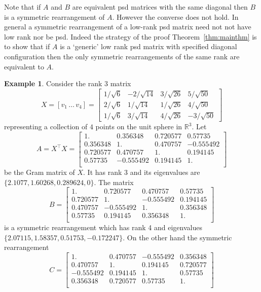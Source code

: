 \documentclass{article}
\theoremstyle{definition}
\newtheorem{Example}{Example}
\renewcommand{\r}{\mathbb{R}}
\renewcommand{\|}{|}
\begin{document}
Note that if $A$ and $B$ are equivalent psd matrices with the same diagonal then $B$ is a symmetric rearrangement of $A$. However the converse does not hold. In general a symmetric rearrangement of a low-rank psd matrix need not not have low rank nor be psd. Indeed the strategy of the proof Theorem~\ref{thm:mainthm} is to show that if $A$ is a `generic' low rank psd matrix with specified
diagonal configuration then the only symmetric rearrangements of the same rank are equivalent to $A$.
\begin{Example}
Consider the rank $3$ matrix 
$$X = [v_1\, \dots\, v_4] = \begin{bmatrix}
    1/\sqrt{6} & -2/\sqrt{14} & 3/\sqrt{26} & 5/\sqrt{50} \\
    2/\sqrt{6} & 1/\sqrt{14} & 1/\sqrt{26} & 4/\sqrt{50} \\
    1/\sqrt{6} & 3/\sqrt{14} & 4/\sqrt{26} & -3/\sqrt{50}
\end{bmatrix}$$representing a collection of $4$ points on the unit sphere in $\r^3$.
Let $$A = X^\top X = \begin{bmatrix}
 1. & 0.356348 & 0.720577 & 0.57735 \\
 0.356348 & 1. & 0.470757 & -0.555492 \\
 0.720577 & 0.470757 & 1. & 0.194145 \\
 0.57735 & -0.555492 & 0.194145 & 1. \\
\end{bmatrix}$$
be the Gram matrix of $X$. It has rank 3 and its eigenvalues are $\{2.1077,1.60268,0.289624,0\}$.
The matrix 
$$B = \begin{bmatrix}
 1. & 0.720577 & 0.470757 & 0.57735 \\
 0.720577 & 1. & -0.555492 & 0.194145 \\
 0.470757 & -0.555492 & 1. & 0.356348 \\
 0.57735 & 0.194145 & 0.356348 & 1. \\
\end{bmatrix}
$$
is a symmetric rearrangement which has rank 4 and eigenvalues $\{2.07115,1.58357,0.51753,-0.172247\}$.
On the other hand the symmetric rearrangement 
$$C = \begin{bmatrix}
 1. & 0.470757 & -0.555492 & 0.356348 \\
 0.470757 & 1. & 0.194145 & 0.720577 \\
 -0.555492 & 0.194145 & 1. & 0.57735 \\
 0.356348 & 0.720577 & 0.57735 & 1. \\
\end{bmatrix}
$$
\end{Example}
\end{document}

